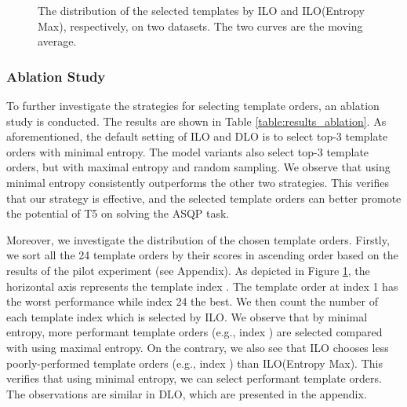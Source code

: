 \documentclass[11pt]{article}
\begin{document}
\begin{figure}[t]
\centering
{}
\caption{The distribution of the selected templates by ILO and ILO(Entropy Max), respectively, on two datasets. The two curves are the moving average.}
\label{fig:figure_template_scale}
\end{figure}


\subsubsection{Ablation Study}
To further investigate the strategies for selecting template orders, an ablation study is conducted. The results are shown in Table \ref{table:results_ablation}. As aforementioned, the default setting of ILO and DLO is to select top-3  template orders with minimal entropy. The model variants also select top-3 template orders, but with maximal entropy and random sampling. We observe that using minimal entropy consistently outperforms the other two strategies. This verifies that our strategy is effective, and the selected template orders can better promote the potential of T5 on solving the ASQP task.







Moreover, we investigate the distribution of the chosen template orders. Firstly, we sort all the 24 template orders by their  scores in ascending order based on the results of the pilot experiment (see Appendix). As depicted in Figure \ref{fig:figure_template_scale}, the horizontal axis represents the template index . The template order at index 1 has the worst performance while index 24 the best. We then count the number of each template index which is selected by ILO. We observe that by minimal entropy, more performant template orders (e.g., index ) are selected compared with using maximal entropy. On the contrary, we also see that ILO chooses less poorly-performed template orders (e.g., index ) than ILO(Entropy Max). This verifies that using minimal entropy, we can select performant template orders. The observations are similar in DLO, which are presented in the appendix.
\end{document}
